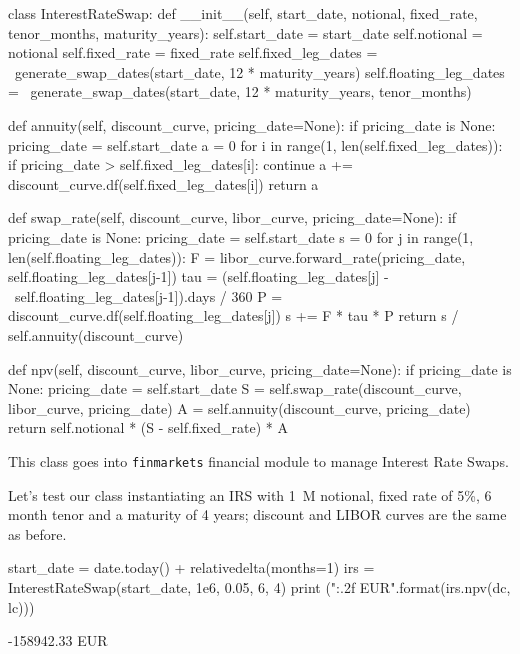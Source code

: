 \begin{ipython}
class InterestRateSwap:
    def __init__(self, start_date, notional,
                 fixed_rate, tenor_months, maturity_years):
        self.start_date = start_date
        self.notional = notional
        self.fixed_rate = fixed_rate
        self.fixed_leg_dates = \
            generate_swap_dates(start_date, 12 * maturity_years)
        self.floating_leg_dates = \
            generate_swap_dates(start_date, 12 * maturity_years, tenor_months)
    
    def annuity(self, discount_curve, pricing_date=None):
        if pricing_date is None:
            pricing_date = self.start_date
        a = 0
        for i in range(1, len(self.fixed_leg_dates)):
            if pricing_date > self.fixed_leg_dates[i]:
                continue
            a += discount_curve.df(self.fixed_leg_dates[i])
        return a

    def swap_rate(self, discount_curve, libor_curve, pricing_date=None):
        if pricing_date is None:
            pricing_date = self.start_date
        s = 0
        for j in range(1, len(self.floating_leg_dates)):
            F = libor_curve.forward_rate(pricing_date, self.floating_leg_dates[j-1])
            tau = (self.floating_leg_dates[j] - \
                self.floating_leg_dates[j-1]).days / 360 
            P = discount_curve.df(self.floating_leg_dates[j])
            s += F * tau * P
        return s / self.annuity(discount_curve)

    def npv(self, discount_curve, libor_curve, pricing_date=None):
        if pricing_date is None:
            pricing_date = self.start_date
        S = self.swap_rate(discount_curve, libor_curve, pricing_date)
        A = self.annuity(discount_curve, pricing_date)
        return self.notional * (S - self.fixed_rate) * A
\end{ipython}

\begin{finmarkets}
This class goes into \texttt{finmarkets} financial module to manage Interest Rate Swaps.
\end{finmarkets}
Let's test our class instantiating an IRS with 1~M notional, fixed rate
of 5\%, 6 month tenor and a maturity of 4 years; discount and LIBOR
curves are the same as before.

\begin{ipython}
start_date = date.today() + relativedelta(months=1)
irs = InterestRateSwap(start_date, 1e6, 0.05, 6, 4)
print ("{:.2f} EUR".format(irs.npv(dc, lc)))
\end{ipython}
\begin{ioutput}
-158942.33 EUR
\end{ioutput}

